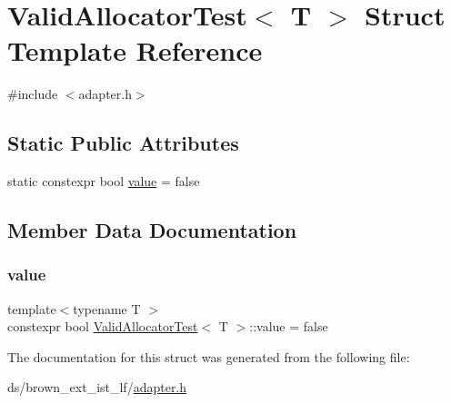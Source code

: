 \hypertarget{structValidAllocatorTest}{}\section{Valid\+Allocator\+Test$<$ T $>$ Struct Template Reference}
\label{structValidAllocatorTest}


{\ttfamily \#include $<$adapter.\+h$>$}

\subsection*{Static Public Attributes}
\begin{DoxyCompactItemize}
\item 
static constexpr bool \hyperlink{structValidAllocatorTest_a16fe23f087d163942944935eff9fd0c2}{value} = false
\end{DoxyCompactItemize}


\subsection{Member Data Documentation}
\mbox{\label{structValidAllocatorTest_a16fe23f087d163942944935eff9fd0c2}} 
\subsubsection{\texorpdfstring{value}{value}}
{\footnotesize\ttfamily template$<$typename T $>$ \\
constexpr bool \hyperlink{structValidAllocatorTest}{Valid\+Allocator\+Test}$<$ T $>$\+::value = false\hspace{0.3cm}{\ttfamily [static]}}



The documentation for this struct was generated from the following file\+:\begin{DoxyCompactItemize}
\item 
ds/brown\+\_\+ext\+\_\+ist\+\_\+lf/\hyperlink{brown__ext__ist__lf_2adapter_8h}{adapter.\+h}\end{DoxyCompactItemize}
